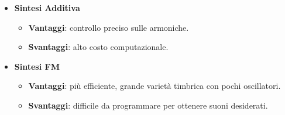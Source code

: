 \begin{itemize}
    \item \textbf{Sintesi Additiva}
    \begin{itemize}
        \item \textbf{Vantaggi}: controllo preciso sulle armoniche.
        \item \textbf{Svantaggi}: alto costo computazionale.
    \end{itemize}
    \item \textbf{Sintesi FM}
    \begin{itemize}
        \item \textbf{Vantaggi}: più efficiente, grande varietà timbrica con pochi oscillatori.
        \item \textbf{Svantaggi}: difficile da programmare per ottenere suoni desiderati.
    \end{itemize}
\end{itemize}
